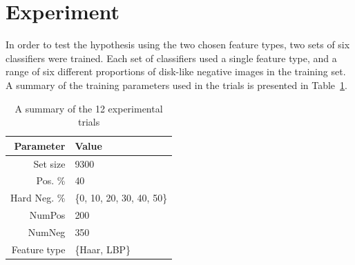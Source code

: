 \documentclass{sig-alternate-05-2015}
\newcommand{\tmpcomment}[1]{}
\begin{document}
	\section{Experiment} {
	\label{sec:experiment}

		In order to test the hypothesis using the two chosen feature types, two sets of six classifiers were trained. Each set of classifiers used a single feature type, and a range of six different proportions of disk-like negative images in the training set. A summary of the training parameters used in the trials is presented in Table~\ref{tab:training_schemes}.




		\begin{table}
			\centering
			\caption{A summary of the 12 experimental trials}
			\label{tab:training_schemes}
			\begin{tabularx}{\columnwidth}{@{}rX@{}}
				\toprule
				\textbf{Parameter} & \textbf{Value} \\
				\midrule
        {Set size}     & 9300 \\
        {Pos. \%}      & 40 \\
        {Hard Neg. \%} & \{0, 10, 20, 30, 40, 50\} \\
        {NumPos}       & 200 \\
        {NumNeg}       & 350 \\
        {Feature type} & \{Haar, LBP\tmpcomment{, HoG}\} \\
				\bottomrule
			\end{tabularx}
		\end{table}

}
\end{document}
